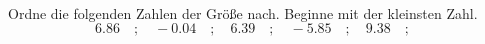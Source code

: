 \begin{aufgabe} ~ \\ 
Ordne die folgenden Zahlen der Größe nach. Beginne mit der kleinsten Zahl.\[6.86\quad ; \quad-0.04\quad ; \quad6.39\quad ; \quad-5.85\quad ; \quad9.38\quad ; \quad\]\underline{\hspace{12cm}}\end{aufgabe} 
